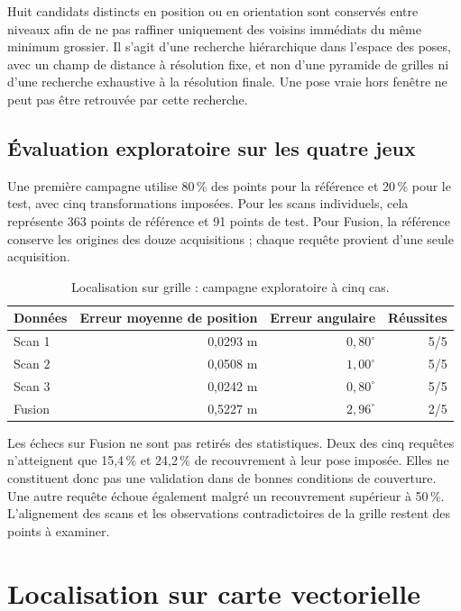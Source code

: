 \documentclass[11pt,a4paper]{article}
\begin{document}
Huit candidats distincts en position ou en orientation sont conservés entre
niveaux afin de ne pas raffiner uniquement des voisins immédiats du même
minimum grossier. Il s'agit d'une recherche hiérarchique dans l'espace des
poses, avec un champ de distance à résolution fixe, et non d'une pyramide
de grilles ni d'une recherche exhaustive à la résolution finale.
Une pose vraie hors fenêtre ne peut pas être retrouvée par cette recherche.

\subsection{Évaluation exploratoire sur les quatre jeux}
Une première campagne utilise 80\,\% des points pour la référence et
20\,\% pour le test, avec cinq transformations imposées. Pour les scans
individuels, cela représente 363 points de référence et 91 points de test.
Pour Fusion, la référence conserve les origines des douze acquisitions ;
chaque requête provient d'une seule acquisition.

\begin{table}[h]
\centering
\caption{Localisation sur grille : campagne exploratoire à cinq cas.}
\begin{tabular}{lrrr}
\toprule
Données & Erreur moyenne de position & Erreur angulaire & Réussites \\
\midrule
Scan 1 & 0,0293 m & $0,80^\circ$ & 5/5 \\
Scan 2 & 0,0508 m & $1,00^\circ$ & 5/5 \\
Scan 3 & 0,0242 m & $0,80^\circ$ & 5/5 \\
Fusion & 0,5227 m & $2,96^\circ$ & 2/5 \\
\bottomrule
\end{tabular}
\end{table}

Les échecs sur Fusion ne sont pas retirés des statistiques. Deux des cinq
requêtes n'atteignent que 15,4\,\% et 24,2\,\% de recouvrement à leur pose
imposée. Elles ne constituent donc pas une validation dans de bonnes
conditions de couverture. Une autre requête échoue également malgré un
recouvrement supérieur à 50\,\%. L'alignement des scans et les observations
contradictoires de la grille restent des points à examiner.

\section{Localisation sur carte vectorielle}
\end{document}
